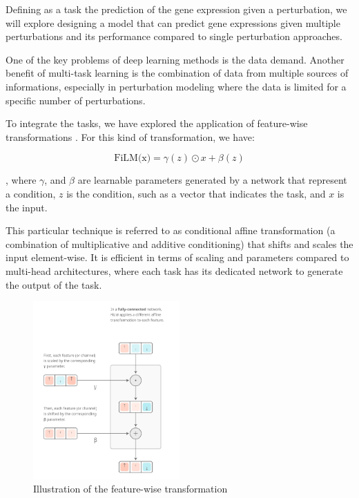 \documentclass[12pt, a4paper]{article}
\begin{document}
Defining as a task the prediction of the gene expression given a perturbation, we will explore designing a model that can predict gene expressions given multiple perturbations and its performance compared to single perturbation approaches.

One of the key problems of deep learning methods is the data demand. Another benefit of multi-task learning is the combination of data from multiple sources of informations, especially in perturbation modeling where the data is limited for a specific number of perturbations. 

To integrate the tasks, we have explored the application of feature-wise transformations \cite{dumoulin2018feature-wise}. For this kind of transformation, we have:

\[ \text{FiLM(x)} = \gamma (z) \odot x + \beta (z) \]

, where $\gamma$, and $\beta$ are learnable parameters generated by a network that represent a condition, $z$ is the condition, such as a vector that indicates the task, and $x$ is the input.

This particular technique is referred to as conditional affine transformation (a combination of multiplicative and additive conditioning) that shifts and scales the input element-wise. It is efficient in terms of scaling and parameters compared to multi-head architectures, where each task has its dedicated network to generate the output of the task.


\begin{figure}
    \centering
    \includegraphics[width=0.5\textwidth]{film_layers.png}
    \caption{Illustration of the feature-wise transformation \cite{dumoulin2018feature-wise}}
    \label{fig:film}
\end{figure}
\end{document}
